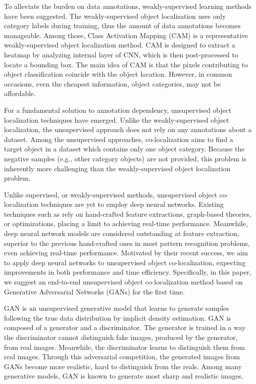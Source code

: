 \documentclass[runningheads]{llncs}
\begin{document}
To alleviate the burden on data annotations, weakly-supervised learning methods have been suggested. The weakly-supervised object localization uses only category labels during training, thus the amount of data annotations becomes manageable. Among those, Class Activation Mapping (CAM) \cite{zhou2016learning} is a representative weakly-supervised object localization method. CAM is designed to extract a heatmap by analyzing internal layer of CNN, which is then post-processed to locate a bounding box. The main idea of CAM is that the pixels contributing to object classification coincide with the object location. However, in common occasions, even the cheapest information, object categories, may not be affordable.

For a fundamental solution to annotation dependency, unsupervised object localization techniques have emerged. Unlike the weakly-supervised object localization, the unsupervised approach does not rely on any annotations about a dataset. Among the unsupervised approaches, co-localization aims to find a target object in a dataset which contains only one object category. Because the negative samples (e.g., other category objects) are not provided, this problem is inherently more challenging than the weakly-supervised object localization problem.

Unlike supervised, or weakly-supervised methods, unsupervised object co-localization techniques are yet to employ deep neural networks. Existing techniques such as \cite{kim2009unsupervised,rubinstein2013unsupervised,tang2014co,zhu2015unsupervised,cho2015unsupervised} rely on hand-crafted feature extractions, graph-based theories, or optimizations, placing a limit to achieving real-time performance. Meanwhile, deep neural network models are considered outstanding at feature extraction, superior to the previous hand-crafted ones in most pattern recognition problems, even achieving real-time performance. Motivated by their recent success, we aim to apply deep neural networks to unsupervised object co-localization, expecting improvements in both performance and time efficiency. Specifically, in this paper, we suggest an end-to-end unsupervised object co-localization method based on Generative Adversarial Networks (GANs) \cite{goodfellow2014generative} for the first time.

GAN is an unsupervised generative model that learns to generate samples following the true data distribution by implicit density estimation. GAN is composed of a generator and a discriminator. The generator is trained in a way the discriminator cannot distinguish fake images, produced by the generator, from real images. Meanwhile, the discriminator learns to distinguish them from real images. Through this adversarial competition, the generated images from GANs become more realistic, hard to distinguish from the reals. Among many generative models, GAN is known to generate most sharp and realistic images.
\end{document}
